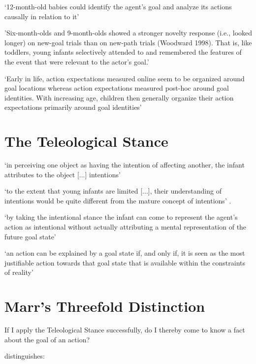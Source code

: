 \documentclass[12pt]{extarticle}
\begin{document}
\begin{multicols}{3}
‘12-month-old babies could identify the agent’s goal and analyze its actions causally in relation to it’
\citep[p.\ 190]{Gergely:1995sq}

'Six-month-olds and 9-month-olds showed a stronger novelty response (i.e., looked longer) on new-goal trials than on new-path trials (Woodward 1998). That is, like toddlers, young infants selectively attended to and remembered the features of the event that were relevant to the actor’s goal.'
\citep[p.\ 153]{woodward:2001_making}

‘Early in life, action expectations measured online seem to be organized
around goal locations whereas action expectations measured post-hoc around
goal identities. With increasing age, children then generally organize
their action expectations primarily around goal identities’
\citep[p.~10]{daum:2012_actions}



\section{The Teleological Stance}

‘in perceiving one object as having the intention of affecting another, the infant attributes to the object [...] intentions’
\citep[p.\ 14]{Premack:1990jl}
\citep[p.~53]{woodward:2009_infants}

‘to the extent that young infants are limited [...], their
understanding of intentions would be quite different from the mature
concept of intentions’
\citep[p.\ 168]{woodward:2001_making}.

‘by taking the intentional stance the infant can come to represent the agent’s action as intentional without actually attributing a mental representation of the future goal state’
\citep[p.\ 188]{Gergely:1995sq}

‘an action can be explained by a goal state if, and only if, it is seen as  the  most justifiable action towards that goal state that is available within the constraints of reality’
\citep[p.~255]{Csibra:1998cx}



\section{Marr’s Threefold Distinction}

If I apply the Teleological Stance successfully, do I thereby come to know a fact about the goal of an action?

\citet[p.~22ff]{Marr:1982kx} distinguishes:


\end{multicols}
\end{document}
